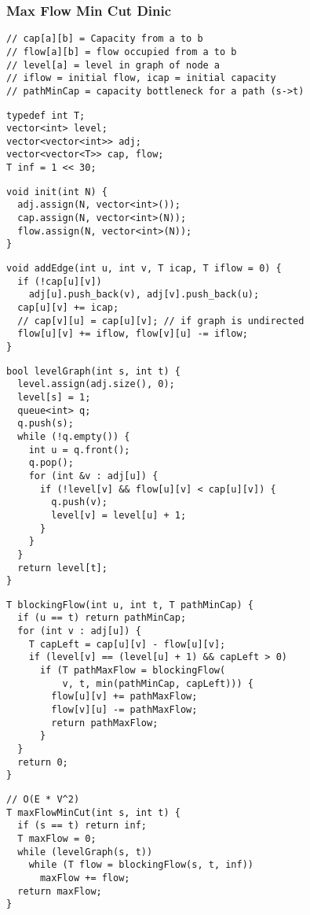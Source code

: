 \documentclass[twoside]{article}
\begin{document}
\begin{multicols*}{2}
\subsubsection*{Max Flow Min Cut Dinic}
\begin{verbatim}
// cap[a][b] = Capacity from a to b
// flow[a][b] = flow occupied from a to b
// level[a] = level in graph of node a
// iflow = initial flow, icap = initial capacity
// pathMinCap = capacity bottleneck for a path (s->t)
\end{verbatim}
\vspace{-12pt}
\begin{verbatim}
typedef int T;
vector<int> level;
vector<vector<int>> adj;
vector<vector<T>> cap, flow;
T inf = 1 << 30;
\end{verbatim}
\vspace{-12pt}
\begin{verbatim}
void init(int N) {
  adj.assign(N, vector<int>());
  cap.assign(N, vector<int>(N));
  flow.assign(N, vector<int>(N));
}
\end{verbatim}
\vspace{-12pt}
\begin{verbatim}
void addEdge(int u, int v, T icap, T iflow = 0) {
  if (!cap[u][v])
    adj[u].push_back(v), adj[v].push_back(u);
  cap[u][v] += icap;
  // cap[v][u] = cap[u][v]; // if graph is undirected
  flow[u][v] += iflow, flow[v][u] -= iflow;
}
\end{verbatim}
\vspace{-12pt}
\begin{verbatim}
bool levelGraph(int s, int t) {
  level.assign(adj.size(), 0);
  level[s] = 1;
  queue<int> q;
  q.push(s);
  while (!q.empty()) {
    int u = q.front();
    q.pop();
    for (int &v : adj[u]) {
      if (!level[v] && flow[u][v] < cap[u][v]) {
        q.push(v);
        level[v] = level[u] + 1;
      }
    }
  }
  return level[t];
}
\end{verbatim}
\vspace{-12pt}
\begin{verbatim}
T blockingFlow(int u, int t, T pathMinCap) {
  if (u == t) return pathMinCap;
  for (int v : adj[u]) {
    T capLeft = cap[u][v] - flow[u][v];
    if (level[v] == (level[u] + 1) && capLeft > 0)
      if (T pathMaxFlow = blockingFlow(
          v, t, min(pathMinCap, capLeft))) {
        flow[u][v] += pathMaxFlow;
        flow[v][u] -= pathMaxFlow;
        return pathMaxFlow;
      }
  }
  return 0;
}
\end{verbatim}
\vspace{-12pt}
\begin{verbatim}
// O(E * V^2)
T maxFlowMinCut(int s, int t) {
  if (s == t) return inf;
  T maxFlow = 0;
  while (levelGraph(s, t))
    while (T flow = blockingFlow(s, t, inf))
      maxFlow += flow;
  return maxFlow;
}
\end{verbatim}


\end{multicols*}
\end{document}
